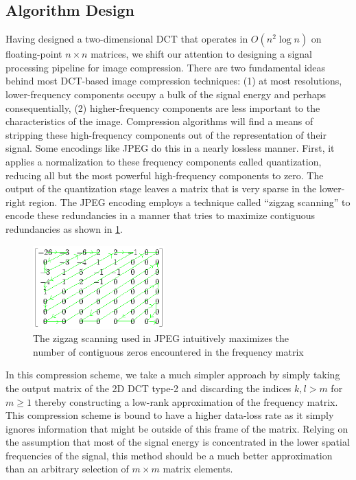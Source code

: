 \documentclass[12pt,technote]{IEEEtran}
\begin{document}
\subsection{Algorithm Design}
Having designed a two-dimensional DCT that operates in $O(n^2\log{n})$ on floating-point $n\times n$ matrices, we shift our attention to designing a signal processing pipeline for image compression. There are two fundamental ideas behind most DCT-based image compression techniques: (1) at most resolutions, lower-frequency components occupy a bulk of the signal energy and perhaps consequentially, (2) higher-frequency components are less important to the characteristics of the image. Compression algorithms will find a means of stripping these high-frequency components out of the representation of their signal. Some encodings like JPEG do this in a nearly lossless manner\cite{JPEG1992}. First, it applies a normalization to these frequency components called quantization, reducing all but the most powerful high-frequency components to zero. The output of the quantization stage leaves a matrix that is very sparse in the lower-right region. The JPEG encoding employs a technique called ``zigzag scanning'' to encode these redundancies in a manner that tries to maximize contiguous redundancies as shown in \ref{fig:zigzag}.
\begin{figure}[h]
    \begin{center}
        \includegraphics[width=2in]{figures/jpeg_zigzag.png}
    \end{center}
    \caption{The zigzag scanning used in JPEG intuitively maximizes the number of contiguous zeros encountered in the frequency matrix}
    \label{fig:zigzag}
\end{figure}
In this compression scheme, we take a much simpler approach by simply taking the output matrix of the 2D DCT type-2 and discarding the indices $k,l > m$ for $m \geq 1$ thereby constructing a low-rank approximation of the frequency matrix. This compression scheme is bound to have a higher data-loss rate as it simply ignores information that might be outside of this frame of the matrix. Relying on the assumption that most of the signal energy is concentrated in the lower spatial frequencies of the signal, this method should be a much better approximation than an arbitrary selection of $m\times m$ matrix elements.
\end{document}
